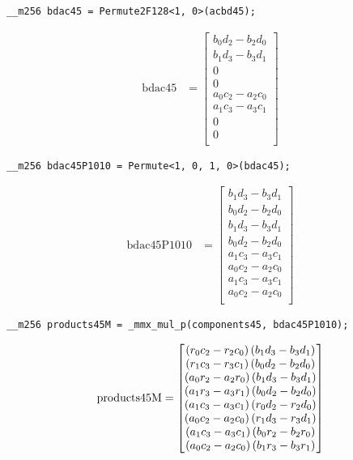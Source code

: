 \begin{verbatim}
__m256 bdac45 = Permute2F128<1, 0>(acbd45);
\end{verbatim} 
\begin{align*}
\mathrm{bdac45} 
&=
\begin{bmatrix}
b_0d_2 - b_2d_0\\
b_1d_3 - b_3d_1\\
0\\
0\\
a_0c_2 - a_2c_0\\
a_1c_3 - a_3c_1\\
0\\
0\\
\end{bmatrix}
\end{align*}

\begin{verbatim}
__m256 bdac45P1010 = Permute<1, 0, 1, 0>(bdac45);
\end{verbatim} 
\begin{align*}
\mathrm{bdac45P1010} 
&=
\begin{bmatrix}
b_1d_3 - b_3d_1\\
b_0d_2 - b_2d_0\\
b_1d_3 - b_3d_1\\
b_0d_2 - b_2d_0\\
a_1c_3 - a_3c_1\\	
a_0c_2 - a_2c_0\\
a_1c_3 - a_3c_1\\	
a_0c_2 - a_2c_0\\	
\end{bmatrix}
\end{align*}


\begin{verbatim}
__m256 products45M = _mmx_mul_p(components45, bdac45P1010);
\end{verbatim} 
\begin{align*}
\mathrm{products45M} 
=
\begin{bmatrix}
\left(r_0c_2 - r_2c_0\right)\left(b_1d_3 - b_3d_1\right)\\
\left(r_1c_3 - r_3c_1\right)\left(b_0d_2 - b_2d_0\right)\\
\left(a_0r_2 - a_2r_0\right)\left(b_1d_3 - b_3d_1\right)\\
\left(a_1r_3 - a_3r_1\right)\left(b_0d_2 - b_2d_0\right)\\
\left(a_1c_3 - a_3c_1\right)\left(r_0d_2 - r_2d_0\right)\\
\left(a_0c_2 - a_2c_0\right)\left(r_1d_3 - r_3d_1\right)\\
\left(a_1c_3 - a_3c_1\right)\left(b_0r_2 - b_2r_0\right)\\
\left(a_0c_2 - a_2c_0\right)\left(b_1r_3 - b_3r_1\right)\\
\end{bmatrix}
\end{align*}

